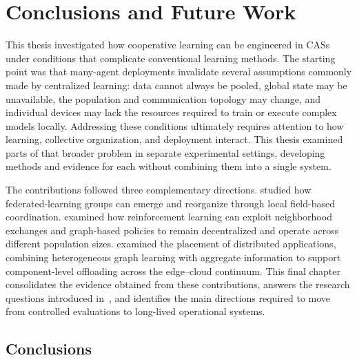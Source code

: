 
\chapter{Conclusions and Future Work}
\label{chap:wrapup}
\minitoc

This thesis investigated how cooperative learning can be engineered
 in \glspl{CAS} under conditions that complicate conventional learning methods.
%
The starting point was that many-agent deployments invalidate several assumptions 
 commonly made by centralized learning: 
 data cannot always be pooled, global state may be unavailable, 
 the population and communication topology may change, 
 and individual devices may lack the resources required to train or execute complex models locally.
%
Addressing these conditions ultimately requires attention to how learning,
 collective organization, and deployment interact.
%
This thesis examined parts of that broader problem in separate experimental settings,
 developing methods and evidence for each without combining them into a single system.

The contributions followed three complementary directions.
%
 studied how federated-learning groups can emerge 
 and reorganize through local field-based coordination.
%
 examined how reinforcement learning can exploit neighborhood exchanges
 and graph-based policies to remain decentralized and operate across different population sizes.
%
 examined the placement of distributed applications,
 combining heterogeneous graph learning with aggregate information to support component-level offloading 
 across the edge--cloud continuum.
%
This final chapter consolidates the evidence obtained from these contributions,
 answers the research questions introduced in~, 
 and identifies the main directions required to move from controlled evaluations 
 to long-lived operational systems.


\section{Conclusions}
\label{sec:conclusions}

